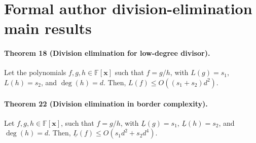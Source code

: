 \section*{Formal author division-elimination main results}
\paragraph{Theorem 18 (Division elimination for low-degree divisor).} Let the polynomials $f,g,h\in\mathbb F[\mathbf x]$ such that $f=g/h$, with $L(g)=s_1$, $L(h)=s_2$, and $\deg(h)=d$. Then, $L(f)\le O((s_1+s_2)d^2)$.
\paragraph{Theorem 22 (Division elimination in border complexity).} Let $f,g,h\in\mathbb F[\mathbf x]$, such that $f=g/h$, with $\underline L(g)=s_1$, $\underline L(h)=s_2$, and $\deg(h)=d$. Then, $\underline L(f)\le O(s_1d^2+s_2d^4)$.
